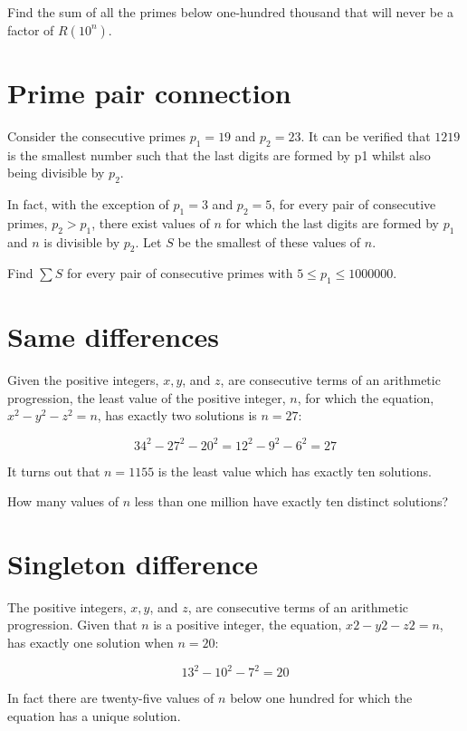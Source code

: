 Find the sum of all the primes below one-hundred thousand that will never be a factor of $R(10^n)$.


\section{Prime pair connection} \label{pb.0134}


Consider the consecutive primes $p_1 = 19$ and $p_2 = 23$. It can be verified that $1219$ is the smallest number such that the last digits are formed by p1 whilst also being divisible by $p_2$.

In fact, with the exception of $p_1 = 3$ and $p_2 = 5$, for every pair of consecutive primes, $p_2 > p_1$, there exist values of $n$ for which the last digits are formed by $p_1$ and $n$ is divisible by $p_2$. Let $S$ be the smallest of these values of $n$.

Find $\sum S$ for every pair of consecutive primes with $5 \leqslant p_1 \leqslant 1000000$.


\section{Same differences} \label{pb.0135}

Given the positive integers, $x, y$, and $z$, are consecutive terms of an arithmetic progression, the least value of the positive integer, $n$, for which the equation, $x^2 - y^2 - z^2 = n$, has exactly two solutions is $n = 27$:

$$34^2 - 27^2 - 20^2 = 12^2 - 9^2 - 6^2 = 27$$

It turns out that $n = 1155$ is the least value which has exactly ten solutions.
\medskip

How many values of $n$ less than one million have exactly ten distinct solutions?


\section{Singleton difference} \label{pb.0136}

The positive integers, $x, y$, and $z$, are consecutive terms of an arithmetic progression. Given that $n$ is a positive integer, the equation, $x2 - y2 - z2 = n$, has exactly one solution when $n = 20$:

$$13^2 - 10^2 - 7^2 = 20$$

In fact there are twenty-five values of $n$ below one hundred for which the equation has a unique solution.
\medskip

